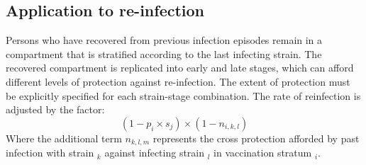 \subsection{Application to re-infection}
Persons who have recovered from previous infection episodes remain in a compartment that is stratified
according to the last infecting strain.
The recovered compartment is replicated into early and late stages,
which can afford different levels of protection against re-infection.
The extent of protection must be explicitly specified for each strain-stage combination.
The rate of reinfection is adjusted by the factor:
\[(1 - p_{i} \times s_{j})\times (1 - n_{i,k,l})\]
Where the additional term \(n_{k,l,m}\) represents the cross protection
afforded by past infection with strain \(_{k}\)
against infecting strain \(_{l}\)
in vaccination stratum \(_{i}\).

